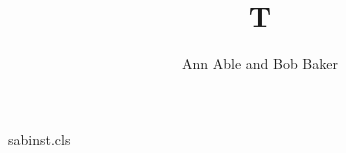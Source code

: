 \begin{filecontents*}[overwrite]{sabinst.cls}
\newdimen\instindent
\def\institute#1{\gdef\@institute{#1}}
\def\institutename{\par
 \begingroup
 \parindent=0pt
 \parskip=0pt
 \refstepcounter{inst}%
 \def\and{\par\refstepcounter{inst}%
 \hangindent\instindent
 \noindent
 \hbox to\instindent{\hss$^{\theinst}$\enspace}\ignorespaces}%
 \setbox0=\vbox{\def\thanks##1{}\@institute}
 \ifnum\value{inst}>9\relax\setbox0=\hbox{$^{88}$\enspace}%
                 \else\setbox0=\hbox{$^{8}$\enspace}\fi
 \instindent=\wd0\relax
 \ifnum\value{inst}=1\relax
 \else
   \setcounter{inst}{1}%
   \hangindent\instindent
   \noindent
   \hbox to\instindent{\hss$^{\theinst}$\enspace}\ignorespaces
 \fi
 \small
 \ignorespaces
 \@institute\par
 \endgroup}
\def\inst#1{\unskip$^{#1}$}
\def\@maketitle{\newpage\noindent{\Large\@title\par}\vskip6pt
  {\large\noindent\ignorespaces\@author\par}\vskip6pt
  \small\rm\leftskip=.8cm\rightskip=\leftskip\institutename}
\end{filecontents*}
\documentclass{sabinst}
\newcommand\ia{\inst{1}}\newcommand\ib{}

\title{T}
\author{Ann Able\ia{} and Bob Baker\ib}
\maketitle
Text.

